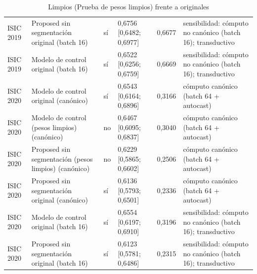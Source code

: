 \begin{table}[ht]
{\begin{tabular}{@{}llllll@{}}
ISIC 2019 & Proposed sin segmentación original (batch 16) & sí & 0,6756 [0,6482; 0,6977] & 0,6677 & sensibilidad: cómputo no canónico (batch 16); transductivo \\
ISIC 2019 & Modelo de control original (batch 16) & sí & 0,6522 [0,6256; 0,6759] & 0,6669 & sensibilidad: cómputo no canónico (batch 16); transductivo \\
ISIC 2020 & Modelo de control original (canónico) & sí & 0,6543 [0,6164; 0,6896] & 0,3166 & cómputo canónico (batch 64 + autocast) \\
ISIC 2020 & Modelo de control (pesos limpios) (canónico) & no & 0,6467 [0,6095; 0,6837] & 0,3040 & cómputo canónico (batch 64 + autocast) \\
ISIC 2020 & Proposed sin segmentación (pesos limpios) (canónico) & no & 0,6229 [0,5865; 0,6602] & 0,2506 & cómputo canónico (batch 64 + autocast) \\
ISIC 2020 & Proposed sin segmentación original (canónico) & sí & 0,6136 [0,5793; 0,6501] & 0,2336 & cómputo canónico (batch 64 + autocast) \\
ISIC 2020 & Modelo de control original (batch 16) & sí & 0,6554 [0,6197; 0,6910] & 0,3196 & sensibilidad: cómputo no canónico (batch 16); transductivo \\
ISIC 2020 & Proposed sin segmentación original (batch 16) & sí & 0,6123 [0,5781; 0,6486] & 0,2315 & sensibilidad: cómputo no canónico (batch 16); transductivo \\
\bottomrule
\end{tabular}}
\caption{Limpios (Prueba de pesos limpios) frente a originales}\label{tab:ablation-clean}
\end{table}

